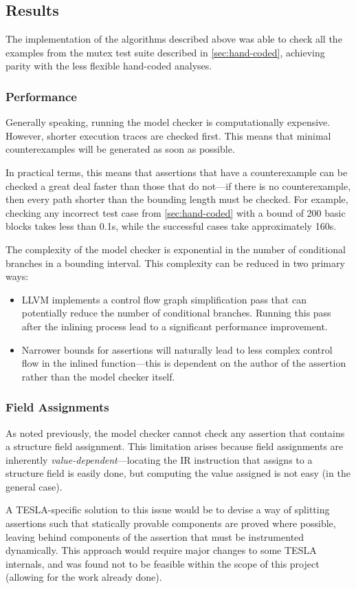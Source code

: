 \subsection{Results} \label{sec:model-limits}

The implementation of the algorithms described above was able to check all the
examples from the mutex test suite described in \autoref{sec:hand-coded},
achieving parity with the less flexible hand-coded analyses.

\subsubsection{Performance}

Generally speaking, running the model checker is computationally expensive.
However, shorter execution traces are checked first. This means that minimal
counterexamples will be generated as soon as possible.

In practical terms, this means that assertions that have a counterexample can be
checked a great deal faster than those that do not---if there is no
counterexample, then every path shorter than the bounding length must be
checked. For example, checking any incorrect test case from
\autoref{sec:hand-coded} with a bound of 200 basic blocks takes less than
\num{0.1}\si{\second}, while the successful cases take approximately
\num{160}\si{\second}. 

The complexity of the model checker is exponential in the number of conditional
branches in a bounding interval. This complexity can be reduced in two primary
ways:
\begin{itemize}
  \item LLVM implements a control flow graph simplification pass that can
    potentially reduce the number of conditional branches. Running this pass
    after the inlining process lead to a significant performance improvement.
  \item Narrower bounds for assertions will naturally lead to less complex
    control flow in the inlined function---this is dependent on the author of
    the assertion rather than the model checker itself.
\end{itemize}

\subsubsection{Field Assignments}

As noted previously, the model checker cannot check any assertion that
contains a structure field assignment. This limitation arises because
field assignments are inherently \emph{value-dependent}---locating the
IR instruction that assigns to a structure field is easily done, but
computing the value assigned is not easy (in the general case).

A TESLA-specific solution to this issue would be to devise a way of
splitting assertions such that statically provable components are proved
where possible, leaving behind components of the assertion that must be
instrumented dynamically. This approach would require major changes to
some TESLA internals, and was found not to be feasible within the scope
of this project (allowing for the work already done).
